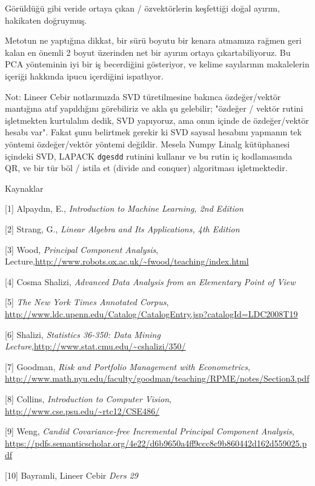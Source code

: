\documentclass[12pt,fleqn]{article}\usepackage{../../common}
\begin{document}
Görüldüğü gibi veride ortaya çıkan / özvektörlerin keşfettiği doğal
ayırım, hakikaten doğruymuş.

Metotun ne yaptığına dikkat, bir sürü boyutu bir kenara atmamıza
rağmen geri kalan en önemli 2 boyut üzerinden net bir ayırım ortaya
çıkartabiliyoruz. Bu PCA yönteminin iyi bir iş becerdiğini gösteriyor,
ve kelime sayılarının makalelerin içeriği hakkında ipucu içerdiğini
ispatlıyor.

Not: Lineer Cebir notlarımızda SVD türetilmesine bakınca özdeğer/vektör
mantığına atıf yapıldığını görebiliriz ve akla şu gelebilir; "özdeğer / vektör
rutini işletmekten kurtulalım dedik, SVD yapıyoruz, ama onun içinde de
özdeğer/vektör hesabı var".  Fakat şunu belirtmek gerekir ki SVD sayısal
hesabını yapmanın tek yöntemi özdeğer/vektör yöntemi değildir. Mesela Numpy
Linalg kütüphanesi içindeki SVD, LAPACK \verb!dgesdd!  rutinini kullanır ve bu
rutin iç kodlamasında QR, ve bir tür böl / istila et (divide and conquer)
algoritması işletmektedir.

Kaynaklar

[1] Alpaydın, E., {\em Introduction to Machine Learning, 2nd Edition}

[2] Strang, G., {\em Linear Algebra and Its Applications, 4th Edition}

[3] Wood, {\em Principal Component Analysis}, Lecture,\url{http://www.robots.ox.ac.uk/~fwood/teaching/index.html}

[4] Cosma Shalizi, {\em Advanced Data Analysis from an Elementary Point of View}

[5] {\em The New York Times Annotated Corpus}, \url{http://www.ldc.upenn.edu/Catalog/CatalogEntry.jsp?catalogId=LDC2008T19}

[6] Shalizi, {\em Statistics 36-350: Data Mining Lecture},\url{http://www.stat.cmu.edu/~cshalizi/350/}

[7] Goodman, {\em Risk and Portfolio Management with Econometrics}, \url{http://www.math.nyu.edu/faculty/goodman/teaching/RPME/notes/Section3.pdf}

[8] Collins, {\em Introduction to Computer Vision}, \url{http://www.cse.psu.edu/~rtc12/CSE486/}

[9] Weng, {\em Candid Covariance-free Incremental Principal Component Analysis}, \url{https://pdfs.semanticscholar.org/4e22/d6b9650a4ff9ccc8c9b860442d162d559025.pdf}

[10] Bayramli, Lineer Cebir {\em Ders 29}
\end{document}
